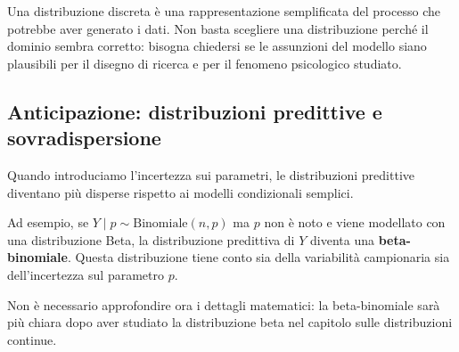 \documentclass[
  italian,
  letterpaper,
  a4paper,
  11pt,
  open=any]{scrbook}
\theoremstyle{plain}
\theoremstyle{definition}
\theoremstyle{definition}
\theoremstyle{remark}
\begin{document}
\begin{tcolorbox}[enhanced jigsaw, arc=.35mm, bottomrule=.15mm, bottomtitle=1mm, breakable, colback=white, colbacktitle=quarto-callout-warning-color!10!white, colframe=quarto-callout-warning-color-frame, coltitle=black, left=2mm, leftrule=.75mm, opacityback=0, opacitybacktitle=0.6, rightrule=.15mm, title=\textcolor{quarto-callout-warning-color}{\faExclamationTriangle}\hspace{0.5em}{Il modello non e il fenomeno}, titlerule=0mm, toprule=.15mm, toptitle=1mm]

Una distribuzione discreta è una rappresentazione semplificata del
processo che potrebbe aver generato i dati. Non basta scegliere una
distribuzione perché il dominio sembra corretto: bisogna chiedersi se le
assunzioni del modello siano plausibili per il disegno di ricerca e per
il fenomeno psicologico studiato.

\end{tcolorbox}

\subsection{Anticipazione: distribuzioni predittive e
sovradispersione}\label{anticipazione-distribuzioni-predittive-e-sovradispersione}

Quando introduciamo l'incertezza sui parametri, le distribuzioni
predittive diventano più disperse rispetto ai modelli condizionali
semplici.

Ad esempio, se \(Y \mid p \sim \mathrm{Binomiale}(n,p)\) ma \(p\) non è
noto e viene modellato con una distribuzione Beta, la distribuzione
predittiva di \(Y\) diventa una \textbf{beta-binomiale}. Questa
distribuzione tiene conto sia della variabilità campionaria sia
dell'incertezza sul parametro \(p\).

Non è necessario approfondire ora i dettagli matematici: la
beta-binomiale sarà più chiara dopo aver studiato la distribuzione beta
nel capitolo sulle distribuzioni continue.
\end{document}
